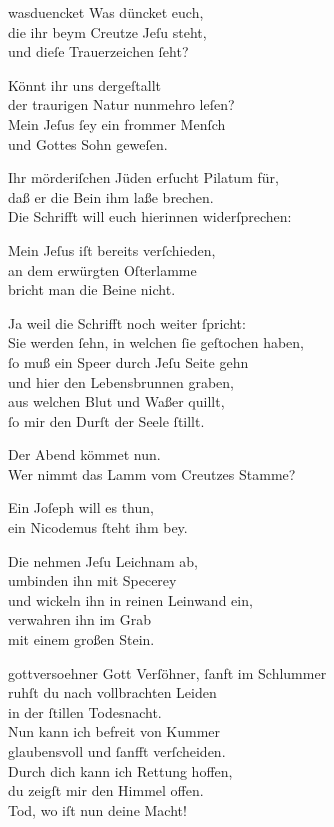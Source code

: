 \documentclass[abbrwidth=6em,tocstyle=ref-genre,shorttitlesize=50]{ees}
\begin{document}
{\begin{movement}{wasduencket}
  \voice[Soprano]
  Was düncket euch,\\
  die ihr beym Creutze Jeſu steht,\\
  und dieſe Trauerzeichen ſeht?

  \voice[Alto]
  Könnt ihr uns dergeſtallt\\
  der traurigen Natur nunmehro leſen?\\
  Mein Jeſus ſey ein frommer Menſch\\
  und Gottes Sohn geweſen.

  \voice[Tenore]
  Ihr mörderiſchen Jüden erſucht Pilatum für,\\
  daß er die Bein ihm laße brechen.\\
  Die Schrifft will euch hierinnen widerſprechen:

  \voice[Basſo]
  Mein Jeſus iſt bereits verſchieden,\\
  an dem erwürgten Oſterlamme\\
  bricht man die Beine nicht.

  \voice[Soprano]
  Ja weil die Schrifft noch weiter ſpricht:\\
  Sie werden ſehn, in welchen ſie geſtochen haben,\\
  ſo muß ein Speer durch Jeſu Seite gehn\\
  und hier den Lebensbrunnen graben,\\
  aus welchen Blut und Waßer quillt,\\
  ſo mir den Durſt der Seele ſtillt.

  \voice[Alto]
  Der Abend kömmet nun.\\
  Wer nimmt das Lamm vom Creutzes Stamme?

  \voice[Tenore]
  Ein Joſeph will es thun,\\
  ein Nicodemus ſteht ihm bey.

  Die nehmen Jeſu Leichnam ab,\\
  umbinden ihn mit Specerey\\
  und wickeln ihn in reinen Leinwand ein,\\
  verwahren ihn im Grab\\
  mit einem großen Stein.
\end{movement}

\begin{movement}{gottversoehner}
  Gott Verſöhner, ſanft im Schlummer\\
  ruhſt du nach vollbrachten Leiden\\
  in der ſtillen Todesnacht.\\
  Nun kann ich befreit von Kummer\\
  glaubensvoll und ſanfft verſcheiden.\\
  Durch dich kann ich Rettung hoffen,\\
  du zeigſt mir den Himmel offen.\\
  Tod, wo iſt nun deine Macht!


\end{movement}}
\end{document}
